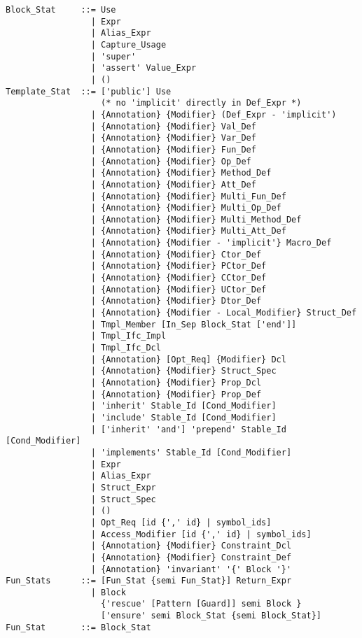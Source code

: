 \syntax\begin{lstlisting}
Block_Stat     ::= Use
                 | Expr
                 | Alias_Expr
                 | Capture_Usage
                 | 'super'
                 | 'assert' Value_Expr
                 | ()
Template_Stat  ::= ['public'] Use
                   (* no 'implicit' directly in Def_Expr *)
                 | {Annotation} {Modifier} (Def_Expr - 'implicit')
                 | {Annotation} {Modifier} Val_Def
                 | {Annotation} {Modifier} Var_Def
                 | {Annotation} {Modifier} Fun_Def
                 | {Annotation} {Modifier} Op_Def
                 | {Annotation} {Modifier} Method_Def
                 | {Annotation} {Modifier} Att_Def
                 | {Annotation} {Modifier} Multi_Fun_Def
                 | {Annotation} {Modifier} Multi_Op_Def
                 | {Annotation} {Modifier} Multi_Method_Def
                 | {Annotation} {Modifier} Multi_Att_Def
                 | {Annotation} {Modifier - 'implicit'} Macro_Def
                 | {Annotation} {Modifier} Ctor_Def
                 | {Annotation} {Modifier} PCtor_Def
                 | {Annotation} {Modifier} CCtor_Def
                 | {Annotation} {Modifier} UCtor_Def
                 | {Annotation} {Modifier} Dtor_Def
                 | {Annotation} {Modifier - Local_Modifier} Struct_Def
                 | Tmpl_Member [In_Sep Block_Stat ['end']]
                 | Tmpl_Ifc_Impl
                 | Tmpl_Ifc_Dcl
                 | {Annotation} [Opt_Req] {Modifier} Dcl
                 | {Annotation} {Modifier} Struct_Spec
                 | {Annotation} {Modifier} Prop_Dcl
                 | {Annotation} {Modifier} Prop_Def
                 | 'inherit' Stable_Id [Cond_Modifier]
                 | 'include' Stable_Id [Cond_Modifier]
                 | ['inherit' 'and'] 'prepend' Stable_Id [Cond_Modifier]
                 | 'implements' Stable_Id [Cond_Modifier]
                 | Expr
                 | Alias_Expr
                 | Struct_Expr
                 | Struct_Spec
                 | ()
                 | Opt_Req [id {',' id} | symbol_ids]
                 | Access_Modifier [id {',' id} | symbol_ids]
                 | {Annotation} {Modifier} Constraint_Dcl
                 | {Annotation} {Modifier} Constraint_Def
                 | {Annotation} 'invariant' '{' Block '}'
Fun_Stats      ::= [Fun_Stat {semi Fun_Stat}] Return_Expr
                 | Block
                   {'rescue' [Pattern [Guard]] semi Block }
                   ['ensure' semi Block_Stat {semi Block_Stat}]
Fun_Stat       ::= Block_Stat

\end{lstlisting}
